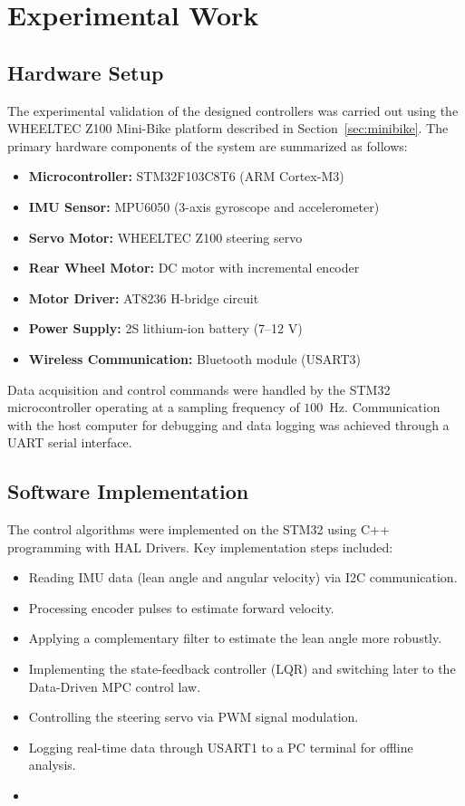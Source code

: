 \chapter{Experimental Work}
\label{chap:experimental_work}

\section{Hardware Setup}

The experimental validation of the designed controllers was carried out using the WHEELTEC Z100 Mini-Bike platform described in Section~\ref{sec:minibike}.
The primary hardware components of the system are summarized as follows:

\begin{itemize}
	\item \textbf{Microcontroller:} STM32F103C8T6 (ARM Cortex-M3)
	\item \textbf{IMU Sensor:} MPU6050 (3-axis gyroscope and accelerometer)
	\item \textbf{Servo Motor:} WHEELTEC Z100 steering servo
	\item \textbf{Rear Wheel Motor:} DC motor with incremental encoder
	\item \textbf{Motor Driver:} AT8236 H-bridge circuit
	\item \textbf{Power Supply:} 2S lithium-ion battery (7--12 V)
	\item \textbf{Wireless Communication:} Bluetooth module (USART3)
\end{itemize}

Data acquisition and control commands were handled by the STM32 microcontroller operating at a sampling frequency of $100$~Hz.
Communication with the host computer for debugging and data logging was achieved through a UART serial interface.

\section{Software Implementation}

The control algorithms were implemented on the STM32 using C++ programming with HAL Drivers.
Key implementation steps included:
\begin{itemize}
	\item Reading IMU data (lean angle and angular velocity) via I2C communication.
	\item Processing encoder pulses to estimate forward velocity.
	\item Applying a complementary filter to estimate the lean angle more robustly.
	\item Implementing the state-feedback controller (LQR) and switching later to the Data-Driven MPC control law.
	\item Controlling the steering servo via PWM signal modulation.
	\item Logging real-time data through USART1 to a PC terminal for offline analysis.
	\item {}
\end{itemize}


